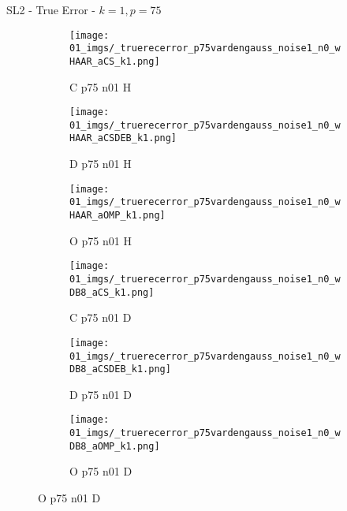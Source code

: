 \begin{frame}{SL2 - True Error - $k=1,p=75$}{}
\begin{figure}
\begin{subfigure}{0.13\textwidth}
\texttt{[image: 01\_imgs/\_truerecerror\_p75vardengauss\_noise1\_n0\_wHAAR\_aCS\_k1.png]}
\caption*{\tiny C p75 n01 H}
\end{subfigure}
\begin{subfigure}{0.13\textwidth}
\texttt{[image: 01\_imgs/\_truerecerror\_p75vardengauss\_noise1\_n0\_wHAAR\_aCSDEB\_k1.png]}
\caption*{\tiny D p75 n01 H}
\end{subfigure}
\begin{subfigure}{0.13\textwidth}
\texttt{[image: 01\_imgs/\_truerecerror\_p75vardengauss\_noise1\_n0\_wHAAR\_aOMP\_k1.png]}
\caption*{\tiny O p75 n01 H}
\end{subfigure}
\begin{subfigure}{0.13\textwidth}
\texttt{[image: 01\_imgs/\_truerecerror\_p75vardengauss\_noise1\_n0\_wDB8\_aCS\_k1.png]}
\caption*{\tiny C p75 n01 D}
\end{subfigure}
\begin{subfigure}{0.13\textwidth}
\texttt{[image: 01\_imgs/\_truerecerror\_p75vardengauss\_noise1\_n0\_wDB8\_aCSDEB\_k1.png]}
\caption*{\tiny D p75 n01 D}
\end{subfigure}
\begin{subfigure}{0.13\textwidth}
\texttt{[image: 01\_imgs/\_truerecerror\_p75vardengauss\_noise1\_n0\_wDB8\_aOMP\_k1.png]}
\caption*{\tiny O p75 n01 D}
\end{subfigure}

\vspace{5pt}


\end{figure}
\end{frame}
